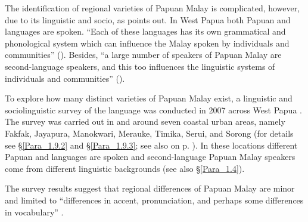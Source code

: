 The identification of regional varieties of Papuan Malay is complicated, however, due to its linguistic and socio, as \citet{Paauw.2009} points out. In West Papua both Papuan and  languages are spoken.  ``Each of these languages has its own grammatical and phonological system which can influence the Malay spoken by individuals and communities'' (\citeyear*[75]{Paauw.2009}). Besides,  ``a large number of speakers of Papuan Malay are second-language speakers, and this too influences the linguistic systems of individuals and communities'' (\citeyear*[76]{Paauw.2009}).



To explore how many distinct varieties of Papuan Malay exist, a linguistic and sociolinguistic survey of the language was conducted in 2007 across West Papua \citep{Scott.2008}. The survey was carried out in and around seven coastal urban areas, namely Fakfak, Jayapura, Manokwari, Merauke, Timika, Serui, and Sorong (for details see §\ref{Para_1.9.2} and §\ref{Para_1.9.3}; see also  on p. \pageref{Figure_0.2}). In these locations different Papuan and  languages are spoken and second-language Papuan Malay speakers come from different linguistic backgrounds (see also §\ref{Para_1.4}).



The survey results suggest that regional differences of Papuan Malay are minor and limited to  ``differences in accent, pronunciation, and perhaps some differences in vocabulary'' \citep[18]{Scott.2008}.



